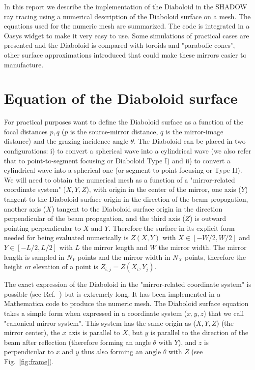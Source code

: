 \documentclass[a4paper, 11pt]{article}
\begin{document}
In this report we describe the implementation of the Diaboloid in the SHADOW \cite{codeSHADOW} ray tracing using a numerical description of the Diaboloid surface on a mesh. The equations used for the numeric mesh are summarized. The code is integrated in a Oasys \cite{codeOASYS} widget to make it very easy to use. Some simulations of practical cases are presented and the Diaboloid is compared with toroids and "parabolic cones", other surface approximations introduced that could make these mirrors easier to manufacture. 

\section{Equation of the Diaboloid surface}

For practical purposes want to define the Diaboloid surface as a function of the focal distances $p,q$ ($p$ is the source-mirror distance, $q$ is the mirror-image distance) and the grazing incidence angle $\theta$. The Diaboloid can be placed in two configurations: i) to convert a spherical wave into a cylindrical wave (we also refer that to point-to-segment focusing or Diaboloid Type I) and ii) to convert a cylindrical wave into a spherical one (or segment-to-point focusing or Type II). We will need to obtain the numerical mesh as a function of a "mirror-related coordinate system" ($X,Y,Z$), with origin in the center of the mirror, one axis ($Y$) tangent to the Diaboloid surface origin in the direction of the beam propagation, another axis ($X$) tangent to the Diaboloid surface origin in the direction perpendicular of the beam propagation, and the third axis ($Z$) is outward pointing perpendicular to $X$ and $Y$. Therefore the surface in its explicit form needed for being evaluated numerically is $Z(X,Y)$ with $X \in [-W/2, W/2]$ and $Y \in [-L/2, L/2]$ with $L$ the mirror length and $W$ the mirror width. The mirror length is sampled in $N_Y$ points and the mirror width in $N_X$ points, therefore the height or elevation of a point is $Z_{i,j}=Z(X_i,Y_j)$.

The exact expression of the Diaboloid in the "mirror-related coordinate system" is possible (see Ref.~\cite{Valeriy2020b}) but is extremely long. It has been implemented in a Mathematica code \cite{lacey} to produce the numeric mesh. The Diaboloid surface equation takes a simple form when expressed in a coordinate system ($x,y,z$) that we call "canonical-mirror system". This system has the same origin as ($X,Y,Z$) (the mirror center), the $x$ axis is parallel to $X$, but $y$ is parallel to the direction of the beam after reflection (therefore forming an angle $\theta$ with $Y$), and $z$ is perpendicular to $x$ and $y$ thus also forming an angle $\theta$ with $Z$ (see Fig.~\ref{fig:frame}).
\end{document}
